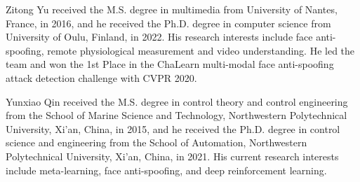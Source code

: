 \documentclass[10pt,journal,compsoc]{IEEEtran}
\begin{document}
\begin{IEEEbiography}{Zitong Yu}
 received the M.S. degree in multimedia from University of Nantes, France, in 2016, and he received the Ph.D. degree in computer science from University of Oulu, Finland, in 2022. His research interests include face anti-spoofing, remote physiological measurement and video understanding. He led the team and won the 1st Place in the ChaLearn multi-modal face anti-spoofing attack detection challenge with CVPR 2020.
\end{IEEEbiography}





\begin{IEEEbiography}{Yunxiao Qin} received the M.S. degree in control theory and control engineering from the School of Marine Science and Technology, Northwestern Polytechnical University, Xi’an, China, in 2015, and he received the Ph.D. degree in control science and engineering from the School of Automation, Northwestern Polytechnical University, Xi’an, China, in 2021. His current research interests include meta-learning, face anti-spoofing, and deep reinforcement learning.
	\end{IEEEbiography}
\end{document}
